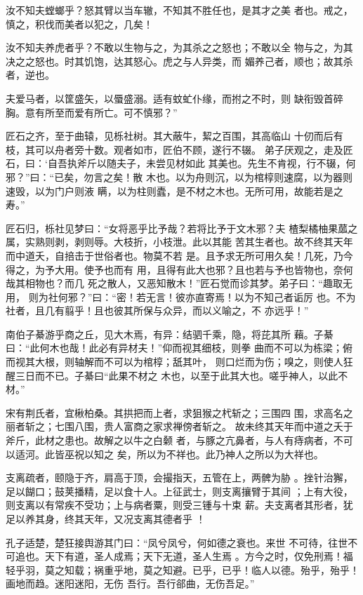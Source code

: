 \documentclass[a4paper,12pt,UTF8,twoside]{ctexbook}
\begin{document}
汝不知夫螳螂乎？怒其臂以当车辙，不知其不胜任也，是其才之美 者也。戒之，慎之，积伐而美者以犯之，几矣！

汝不知夫养虎者乎？不敢以生物与之，为其杀之之怒也；不敢以全 物与之，为其决之之怒也。时其饥饱，达其怒心。虎之与人异类，而 媚养己者，顺也；故其杀者，逆也。

夫爱马者，以筐盛矢，以蜃盛溺。适有蚊虻仆缘，而拊之不时，则 缺衔毁首碎胸。意有所至而爱有所亡。可不慎邪？”

匠石之齐，至于曲辕，见栎社树。其大蔽牛，絜之百围，其高临山 十仞而后有枝，其可以舟者旁十数。观者如市，匠伯不顾，遂行不辍。 弟子厌观之，走及匠石，曰：‘自吾执斧斤以随夫子，未尝见材如此 其美也。先生不肯视，行不辍，何邪？”曰：“已矣，勿言之矣！散 木也。以为舟则沉，以为棺椁则速腐，以为器则速毁，以为门户则液 瞒，以为柱则蠹，是不材之木也。无所可用，故能若是之寿。”

匠石归，栎社见梦曰：“女将恶乎比予哉？若将比予于文木邪？夫 楂梨橘柚果蓏之属，实熟则剥，剥则辱。大枝折，小枝泄。此以其能 苦其生者也。故不终其天年而中道夭，自掊击于世俗者也。物莫不若 是。且予求无所可用久矣！几死，乃今得之，为予大用。使予也而有 用，且得有此大也邪？且也若与予也皆物也，奈何哉其相物也？而几 死之散人，又恶知散木！”匠石觉而诊其梦。弟子曰：“趣取无用， 则为社何邪？”曰：“密！若无言！彼亦直寄焉！以为不知己者诟厉 也。不为社者，且几有翦乎！且也彼其所保与众异，而以义喻之，不 亦远乎！”

南伯子綦游乎商之丘，见大木焉，有异：结驷千乘，隐，将芘其所 藾。子綦曰：“此何木也哉！此必有异材夫！”仰而视其细枝，则拳 曲而不可以为栋梁；俯而视其大根，则轴解而不可以为棺椁；舐其叶， 则口烂而为伤；嗅之，则使人狂醒三日而不已。子綦曰“此果不材之 木也，以至于此其大也。嗟乎神人，以此不材。”

宋有荆氏者，宜楸柏桑。其拱把而上者，求狙猴之杙斩之；三围四 围，求高名之丽者斩之；七围八围，贵人富商之家求禅傍者斩之。 故未终其天年而中道之夭于斧斤，此材之患也。故解之以牛之白颡 者，与豚之亢鼻者，与人有痔病者，不可以适河。此皆巫祝以知之 矣，所以为不祥也。此乃神人之所以为大祥也。

支离疏者，颐隐于齐，肩高于顶，会撮指天，五管在上，两髀为胁 。挫针治獬，足以餬口；鼓荚播精，足以食十人。上征武士，则支离攘臂于其间 ；上有大役，则支离以有常疾不受功；上与病者粟，则受三锺与十束 薪。夫支离者其形者，犹足以养其身，终其天年，又况支离其德者乎 ！

孔子适楚，楚狂接舆游其门曰：“凤兮凤兮，何如德之衰也。来世 不可待，往世不可追也。天下有道，圣人成焉；天下无道，圣人生焉 。方今之时，仅免刑焉！福轻乎羽，莫之知载；祸重乎地，莫之知避。已乎，已乎！临人以德。殆乎，殆乎！画地而趋。迷阳迷阳，无伤 吾行。吾行郤曲，无伤吾足。”
\end{document}
